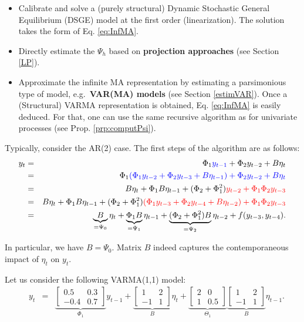 \documentclass[
]{book}
\providecommand{\tightlist}{%
  \setlength{\itemsep}{0pt}\setlength{\parskip}{0pt}}
\theoremstyle{definition}
\theoremstyle{definition}
\theoremstyle{definition}
\theoremstyle{definition}
\theoremstyle{remark}
\begin{document}
\begin{itemize}
\tightlist
\item
  Calibrate and solve a (purely structural) Dynamic Stochastic General Equilibrium (DSGE) model at the first order (linearization). The solution takes the form of Eq. \eqref{eq:InfMA}.
\item
  Directly estimate the \(\Psi_{h}\) based on \textbf{projection approaches} (see Section \ref{LP}).
\item
  Approximate the infinite MA representation by estimating a parsimonious type of model, e.g.~\textbf{VAR(MA) models} (see Section \ref{estimVAR}). Once a (Structural) VARMA representation is obtained, Eq. \eqref{eq:InfMA} is easily deduced. For that, one can use the same recursive algorithm as for univariate processes (see Prop. \ref{prp:computPsi}).
\end{itemize}

Typically, consider the AR(2) case. The first steps of the algorithm are as follows:
\begin{eqnarray*}
y_t &=& \Phi_1 {\color{blue}y_{t-1}} + \Phi_2 y_{t-2} + B \eta_t  \\
&=& \Phi_1 \color{blue}{(\Phi_1 y_{t-2} + \Phi_2 y_{t-3} + B \eta_{t-1})} + \Phi_2 y_{t-2} + B \eta_t  \\
&=& B \eta_t + \Phi_1 B \eta_{t-1} + (\Phi_2 + \Phi_1^2) \color{red}{y_{t-2}} + \Phi_1\Phi_2 y_{t-3}  \\
&=& B \eta_t + \Phi_1 B \eta_{t-1} + (\Phi_2 + \Phi_1^2) \color{red}{(\Phi_1 y_{t-3} + \Phi_2 y_{t-4} + B \eta_{t-2})} + \Phi_1\Phi_2 y_{t-3} \\
&=& \underbrace{B}_{=\Psi_0} \eta_t + \underbrace{\Phi_1 B}_{=\Psi_1} \eta_{t-1} + \underbrace{(\Phi_2 + \Phi_1^2)B}_{=\Psi_2} \eta_{t-2} + f(y_{t-3},y_{t-4}).
\end{eqnarray*}

In particular, we have \(B = \Psi_0\). Matrix \(B\) indeed captures the contemporaneous impact of \(\eta_t\) on \(y_t\).

Let us consider the following VARMA(1,1) model:
\begin{eqnarray}
\quad y_t &=&
\underbrace{\left[\begin{array}{cc}
0.5 & 0.3 \\
-0.4 & 0.7
\end{array}\right]}_{\Phi_1}
y_{t-1} +  
\underbrace{\left[\begin{array}{cc}
1 & 2 \\
-1 & 1
\end{array}\right]}_{B}\eta_t + \underbrace{\left[\begin{array}{cc}
2 & 0 \\
1 & 0.5
\end{array}\right]}_{\Theta_1} \underbrace{\left[\begin{array}{cc}
1 & 2 \\
-1 & 1
\end{array}\right]}_{B}\eta_{t-1}.\label{eq:VARMA111}
\end{eqnarray}
\end{document}
